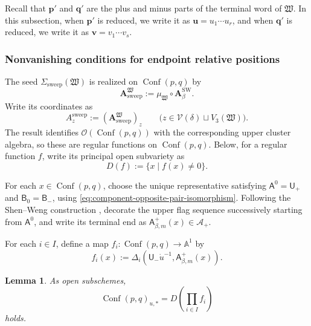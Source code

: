 \documentclass[10pt,a4paper]{article}
\newtheorem{lemma}[theorem]{Lemma}
\theoremstyle{definition}
\theoremstyle{remark}
\newcommand{\Aplus}{\mathcal A_+}
\newcommand{\flagA}{\mathsf{A}}
\newcommand{\flagB}{\mathsf{B}}
\newcommand{\borelB}{\mathsf{B}}
\newcommand{\unipotentU}{\mathsf{U}}
\newcommand{\Conf}{\operatorname{Conf}}
\newcommand{\Vcal}{\mathcal V}
\newcommand{\fW}{\mathfrak W}
\begin{document}
Recall that \(\mathbf p'\) and \(\mathbf q'\) are the plus and minus parts of the 
terminal word of \(\fW\).
In this subsection, 
when \(\mathbf p'\) is reduced, we write it as
\(\mathbf u=u_1\cdots u_r\), and when \(\mathbf q'\) is reduced, we write it as
\(\mathbf v=v_1\cdots v_s\).

\subsubsection{Nonvanishing conditions for endpoint relative positions}

The seed \(\Sigma_{\mathrm{sweep}}(\fW)\) is realized on \(\Conf(p,q)\) by
\[
 \mathbf A_{\mathrm{sweep}}^\fW
 :=\mu_\fW\circ\mathbf A_\beta^{\mathrm{SW}}.
\]
Write its coordinates as
\begin{equation}
 A_z^{\mathrm{sweep}}
 :=\left(\mathbf A_{\mathrm{sweep}}^\fW\right)_z
 \qquad
 \bigl(z\in\Vcal(\delta)\sqcup V_3(\fW)\bigr).
 \label{eq:term-regular-functions}
\end{equation}
The result \cite[Theorem~3.45]{ShenWeng2021} identifies \(\mathcal O(\Conf(p,q))\) with
the corresponding upper cluster algebra, so these are regular functions on
\(\Conf(p,q)\).  Below, for a regular function \(f\), write its principal open
subvariety as
\[
 D(f):=\{x\mid f(x)\ne0\}.
\]

For each \(x\in\Conf(p,q)\), choose the unique representative satisfying
\(\flagA^0=\unipotentU_+\) and \(\flagB_0=\borelB_-\), using
\eqref{eq:component-opposite-pair-isomorphism}.  Following the
Shen--Weng construction
\cite[Definition~2.9 and Lemma~2.10]{ShenWeng2021}, decorate the upper flag
sequence successively starting from \(\flagA^0\), and write its terminal end
as \(\flagA_{\beta,m}^+(x)\in\Aplus\).

For each \(i\in I\), define a map
\(f_i:\Conf(p,q)\to\mathbb A^1\) by
\begin{equation}
 f_i(x)
 :=\Delta_i\left(
  \unipotentU_-\dot u^{-1},
   \flagA_{\beta,m}^+(x)
  \right).
 \label{eq:plus-endpoint-minor}
\end{equation}

\begin{lemma}
\label{lem:plus-endpoint-minors}
As open subschemes,
\begin{equation}
 \Conf(p,q)_{u,*}
 =D\left(\prod_{i\in I}f_i\right)
 \label{eq:plus-endpoint-minor-locus}
\end{equation}
holds.
\end{lemma}
\end{document}
